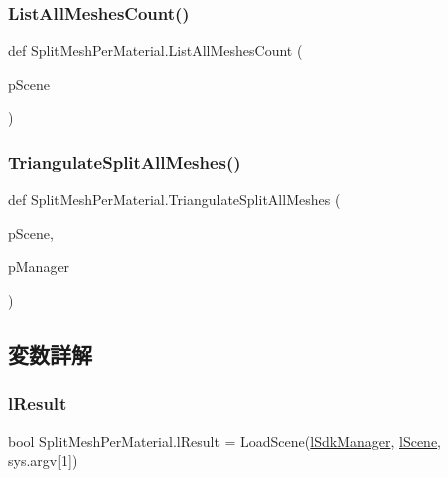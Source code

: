 \subsubsection{\texorpdfstring{List\+All\+Meshes\+Count()}{ListAllMeshesCount()}}
{\footnotesize\ttfamily def Split\+Mesh\+Per\+Material.\+List\+All\+Meshes\+Count (\begin{DoxyParamCaption}\item[{}]{p\+Scene }\end{DoxyParamCaption})}

\mbox{\label{namespace_split_mesh_per_material_a08475e898c81fcec1dadbf5922038767}} 
\subsubsection{\texorpdfstring{Triangulate\+Split\+All\+Meshes()}{TriangulateSplitAllMeshes()}}
{\footnotesize\ttfamily def Split\+Mesh\+Per\+Material.\+Triangulate\+Split\+All\+Meshes (\begin{DoxyParamCaption}\item[{}]{p\+Scene,  }\item[{}]{p\+Manager }\end{DoxyParamCaption})}



\subsection{変数詳解}
\mbox{\label{namespace_split_mesh_per_material_af6533954531a3f4f83b407c90668c26a}} 
\subsubsection{\texorpdfstring{l\+Result}{lResult}}
{\footnotesize\ttfamily bool Split\+Mesh\+Per\+Material.\+l\+Result = Load\+Scene(\hyperlink{namespace_split_mesh_per_material_ab119485698508975c2ebbdc9464143bf}{l\+Sdk\+Manager}, \hyperlink{namespace_split_mesh_per_material_a3318434e073ac3f95a18d2596620937d}{l\+Scene}, sys.\+argv\mbox{[}1\mbox{]})}

